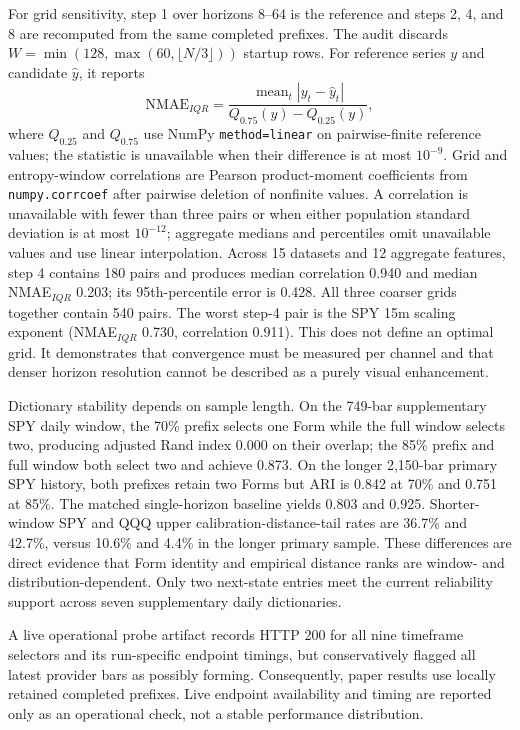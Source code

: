 \documentclass{article}
\newcommand{\mean}{\operatorname{mean}}
\begin{document}
For grid sensitivity, step 1 over horizons 8--64 is the reference and steps 2, 4, and 8 are recomputed from the same completed prefixes. The audit discards $W=\min(128,\max(60,\lfloor N/3\rfloor))$ startup rows. For reference series $y$ and candidate $\widehat y$, it reports
\begin{equation}
\mathrm{NMAE}_{IQR}=\frac{\mean_t|y_t-\widehat y_t|}{Q_{0.75}(y)-Q_{0.25}(y)},
\end{equation}
where $Q_{0.25}$ and $Q_{0.75}$ use NumPy \texttt{method=linear} on pairwise-finite reference values; the statistic is unavailable when their difference is at most $10^{-9}$. Grid and entropy-window correlations are Pearson product-moment coefficients from \texttt{numpy.corrcoef} after pairwise deletion of nonfinite values. A correlation is unavailable with fewer than three pairs or when either population standard deviation is at most $10^{-12}$; aggregate medians and percentiles omit unavailable values and use linear interpolation. Across 15 datasets and 12 aggregate features, step 4 contains 180 pairs and produces median correlation 0.940 and median NMAE$_{IQR}$ 0.203; its 95th-percentile error is 0.428. All three coarser grids together contain 540 pairs. The worst step-4 pair is the SPY 15m scaling exponent (NMAE$_{IQR}$ 0.730, correlation 0.911). This does not define an optimal grid. It demonstrates that convergence must be measured per channel and that denser horizon resolution cannot be described as a purely visual enhancement.

Dictionary stability depends on sample length. On the 749-bar supplementary SPY daily window, the 70\% prefix selects one Form while the full window selects two, producing adjusted Rand index \citep{hubertarabie1985comparing} 0.000 on their overlap; the 85\% prefix and full window both select two and achieve 0.873. On the longer 2,150-bar primary SPY history, both prefixes retain two Forms but ARI is 0.842 at 70\% and 0.751 at 85\%. The matched single-horizon baseline yields 0.803 and 0.925. Shorter-window SPY and QQQ upper calibration-distance-tail rates are 36.7\% and 42.7\%, versus 10.6\% and 4.4\% in the longer primary sample. These differences are direct evidence that Form identity and empirical distance ranks are window- and distribution-dependent. Only two next-state entries meet the current reliability support across seven supplementary daily dictionaries.

A live operational probe artifact records HTTP 200 for all nine timeframe selectors and its run-specific endpoint timings, but conservatively flagged all latest provider bars as possibly forming. Consequently, paper results use locally retained completed prefixes. Live endpoint availability and timing are reported only as an operational check, not a stable performance distribution.
\end{document}
